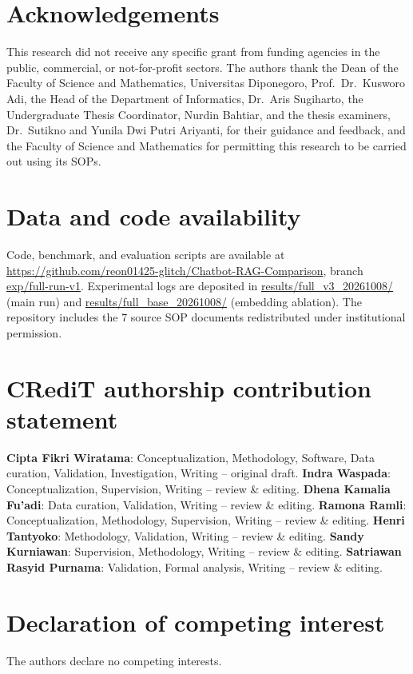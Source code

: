 \documentclass[preprint,10pt]{elsarticle}
\begin{document}
\section*{Acknowledgements}
This research did not receive any specific grant from funding agencies in the public, commercial, or not-for-profit sectors. The authors thank the Dean of the Faculty of Science and Mathematics, Universitas Diponegoro, Prof.\ Dr.\ Kusworo Adi, the Head of the Department of Informatics, Dr.\ Aris Sugiharto, the Undergraduate Thesis Coordinator, Nurdin Bahtiar, and the thesis examiners, Dr.\ Sutikno and Yunila Dwi Putri Ariyanti, for their guidance and feedback, and the Faculty of Science and Mathematics for permitting this research to be carried out using its SOPs.

\section*{Data and code availability}
Code, benchmark, and evaluation scripts are available at \url{https://github.com/reon01425-glitch/Chatbot-RAG-Comparison}, branch \url{exp/full-run-v1}. Experimental logs are deposited in \url{results/full_v3_20261008/} (main run) and \url{results/full_base_20261008/} (embedding ablation). The repository includes the 7 source SOP documents redistributed under institutional permission.

\section*{CRediT authorship contribution statement}
\textbf{Cipta Fikri Wiratama}: Conceptualization, Methodology, Software, Data curation, Validation, Investigation, Writing -- original draft. \textbf{Indra Waspada}: Conceptualization, Supervision, Writing -- review \& editing. \textbf{Dhena Kamalia Fu'adi}: Data curation, Validation, Writing -- review \& editing. \textbf{Ramona Ramli}: Conceptualization, Methodology, Supervision, Writing -- review \& editing. \textbf{Henri Tantyoko}: Methodology, Validation, Writing -- review \& editing. \textbf{Sandy Kurniawan}: Supervision, Methodology, Writing -- review \& editing. \textbf{Satriawan Rasyid Purnama}: Validation, Formal analysis, Writing -- review \& editing.

\section*{Declaration of competing interest}
The authors declare no competing interests.
\end{document}
